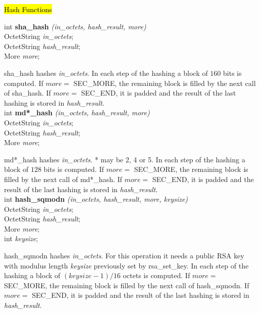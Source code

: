 \hl{Hash Functions}



int {\bf sha\_hash} {\em (in\_octets, hash\_result, more)} \\
OctetString {\em *in\_octets}; \\
OctetString {\em *hash\_result}; \\
More {\em more}; 

sha\_hash hashes {\em in\_octets}. In each step of the hashing a block of
$160$ bits is computed. If $more =$ SEC\_MORE,
the remaining block is filled by the next call of  sha\_hash.
If $more =$ SEC\_END, it is padded and the result of the last hashing is stored in {\em hash\_result}.
\\ [1ex]


int {\bf md*\_hash} {\em (in\_octets, hash\_result, more)} \\
OctetString {\em *in\_octets}; \\
OctetString {\em *hash\_result}; \\
More {\em more}; 

md*\_hash hashes {\em in\_octets}. * may be 2, 4 or 5. In each step of the hashing a block of
$128$ bits is computed. If $more =$ SEC\_MORE,
the remaining block is filled by the next call of  md*\_hash.
If $more =$ SEC\_END, it is padded and the result of the last hashing is stored in {\em hash\_result}.
\\ [1ex]


int {\bf hash\_sqmodn} {\em (in\_octets, hash\_result, more, keysize)} \\
OctetString {\em *in\_octets}; \\
OctetString {\em *hash\_result}; \\
More {\em more}; \\
int {\em keysize};

hash\_sqmodn hashes {\em in\_octets}. For this operation it needs a public RSA key with 
modulus length {\em keysize} previously set by rsa\_set\_key.
In each step of the hashing a block of
$(keysize - 1) / 16$ octets is computed. If $more =$ SEC\_MORE,
the remaining block is filled by the next call of  hash\_sqmodn.
If $more =$ SEC\_END, it is padded and the result of the last hashing is stored in {\em hash\_result}.

